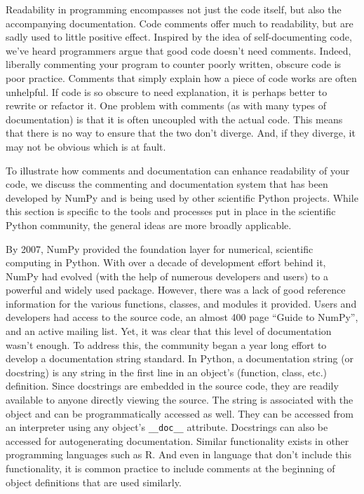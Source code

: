 \documentclass[ChapterTOCs,krantz2]{krantz} %
\theoremstyle{definition}
\begin{document}
Readability in programming encompasses not just the code itself,
but also the accompanying documentation. Code comments offer much to readability,
but are sadly used to little positive effect. Inspired by the idea of
self-documenting code, we've heard programmers argue that good code doesn't
need comments. Indeed, liberally commenting your program to counter poorly
written, obscure code is poor practice. Comments that simply explain how a piece
of code works are often unhelpful. If code is so obscure to need explanation,
it is perhaps better to rewrite or refactor it. One problem with comments (as
with many types of documentation) is that it is often uncoupled with the actual
code. This means that there is no way to ensure that the two don't diverge.
And, if they diverge, it may not be obvious which is at fault.

To illustrate how comments and documentation can enhance readability of your
code, we discuss the commenting and documentation system that has been
developed by NumPy and is being used by other scientific Python projects. While
this section is specific to the tools and processes put in place in the
scientific Python community, the general ideas are more broadly applicable.

By 2007, NumPy provided the foundation layer for numerical, scientific
computing in Python. With over a decade of development effort behind it, NumPy
had evolved (with the help of numerous developers and users) to a powerful and
widely used package. However, there was a lack of good reference information
for the various functions, classes, and modules it provided. Users and
developers had access to the source code, an almost 400 page ``Guide to
NumPy'', and an active mailing list. Yet, it was clear that this level of
documentation wasn't enough. To address this, the community began a year long
effort to develop a documentation string standard. In Python, a documentation
string (or docstring) is any string in the first line in an object's (function,
class, etc.) definition. Since docstrings are embedded in the source code, they
are readily available to anyone directly viewing the source. The string is
associated with the object and can be programmatically accessed as well.  They
can be accessed from an interpreter using any object's \texttt{\_\_doc\_\_}
attribute.  Docstrings can also be accessed for autogenerating documentation.
Similar functionality exists in other programming languages such as R. And even
in language that don't include this functionality, it is common practice to
include comments at the beginning of object definitions that are used
similarly.
\end{document}
